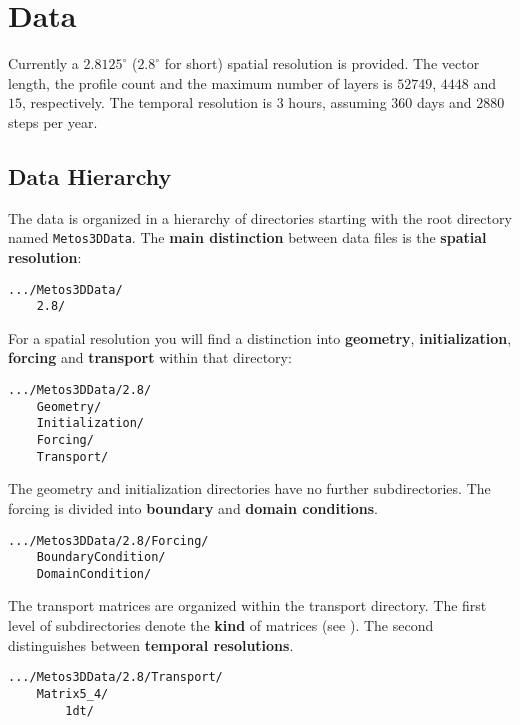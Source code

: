 \documentclass{article}
\begin{document}
%
%
\section{Data}

Currently a $ 2.8125^\circ $ ($ 2.8^\circ $ for short) spatial resolution is provided.
The vector length, the profile count and the maximum number of layers is $ 52749 $, $ 4448 $
and $ 15 $, respectively. The temporal resolution is $ 3 $ hours,
assuming $ 360 $ days and $ 2880 $ steps per year.


%
%
\subsection{Data Hierarchy}

The data is organized in a hierarchy of directories starting with the
root directory named \texttt{Metos3DData}.
The \textbf{main distinction} between data files is the \textbf{spatial resolution}:
\begin{verbatim}
.../Metos3DData/
    2.8/
\end{verbatim}

For a spatial resolution you will find a distinction
into \textbf{geometry}, \textbf{initialization}, \textbf{forcing} and
\textbf{transport} within that directory:
\begin{verbatim}
.../Metos3DData/2.8/
    Geometry/
    Initialization/
    Forcing/
    Transport/
\end{verbatim}

The geometry and initialization directories have no further subdirectories.
The forcing is divided into \textbf{boundary} and \textbf{domain conditions}.
\begin{verbatim}
.../Metos3DData/2.8/Forcing/
    BoundaryCondition/
    DomainCondition/
\end{verbatim}

The transport matrices are organized within the transport directory.
The first level of subdirectories denote the \textbf{kind} of matrices (see \cite{KhViCa05}).
The second distinguishes between \textbf{temporal resolutions}.
\begin{verbatim}
.../Metos3DData/2.8/Transport/
    Matrix5_4/
        1dt/
\end{verbatim}

%
%

%

\end{document}
